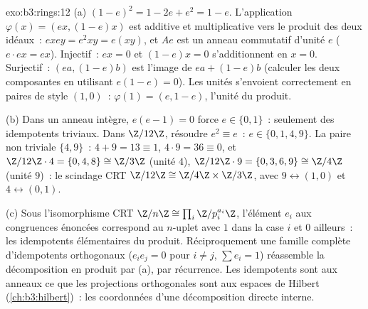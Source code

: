 \begin{solution}{exo:b3:rings:12}
(a) $(1-e)^2 = 1 - 2e + e^2 = 1 - e$. L'application
$\varphi(x) = (ex, (1-e)x)$ est additive et multiplicative vers
le produit des deux idéaux~: $exey = e^2xy = e(xy)$, et $Ae$ est
un anneau commutatif d'unité $e$ ($e\cdot ex = ex$). Injectif~:
$ex = 0$ et $(1-e)x = 0$ s'additionnent en $x = 0$. Surjectif~:
$(ea, (1-e)b)$ est l'image de $ea + (1-e)b$ (calculer les deux
composantes en utilisant $e(1-e) = 0$). Les unités s'envoient
correctement en paires de style $(1, 0)$~: $\varphi(1) = (e,
1-e)$, l'unité du produit.

(b) Dans un anneau intègre, $e(e - 1) = 0$ force $e \in \{0,
1\}$~: seulement des idempotents triviaux. Dans $\Z/12\Z$,
résoudre $e^2 \equiv e$~: $e \in \{0, 1, 4, 9\}$. La paire non
triviale $\{4, 9\}$~: $4 + 9 = 13 \equiv 1$, $4\cdot9 = 36
\equiv 0$, et $\Z/12\Z\cdot4 = \{0, 4, 8\} \cong \Z/3\Z$ (unité
$4$), $\Z/12\Z\cdot9 = \{0, 3, 6, 9\} \cong \Z/4\Z$ (unité
$9$)~: le scindage CRT $\Z/12\Z \cong \Z/4\Z\times\Z/3\Z$, avec
$9 \leftrightarrow (1, 0)$ et $4 \leftrightarrow (0, 1)$.

(c) Sous l'isomorphisme CRT $\Z/n\Z \cong \prod_i
\Z/p_i^{a_i}\Z$, l'élément $e_i$ aux congruences énoncées
correspond au $n$-uplet avec $1$ dans la case $i$ et $0$ ailleurs~:
les idempotents élémentaires du produit. Réciproquement une
famille complète d'idempotents orthogonaux ($e_ie_j = 0$ pour $i
\neq j$, $\sum e_i = 1$) réassemble la décomposition en produit
par (a), par récurrence. Les idempotents sont aux anneaux ce que
les projections orthogonales sont aux espaces de Hilbert
(\cref{ch:b3:hilbert})~: les coordonnées d'une décomposition
directe interne.
\end{solution}

